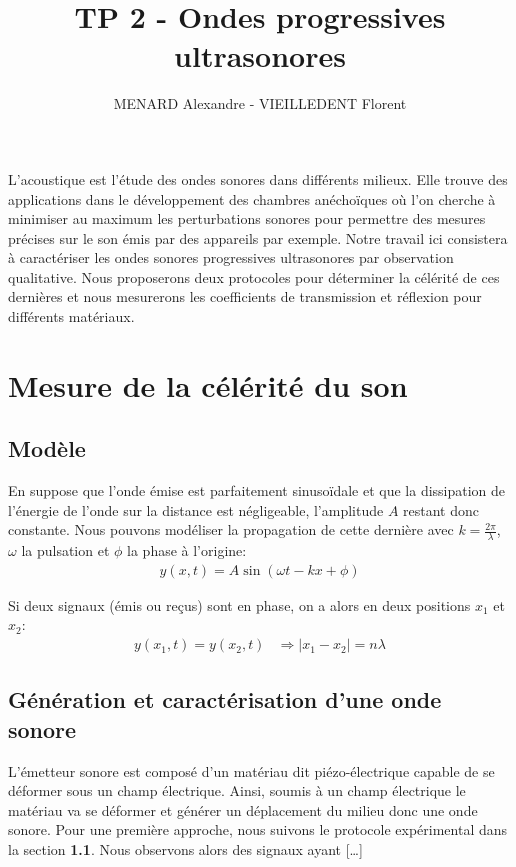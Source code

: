\documentclass[12pt]{article}
\title{\vspace{-2cm}\textbf{TP 2 - Ondes progressives ultrasonores}}
\author{MENARD Alexandre - VIEILLEDENT Florent}
\date{\vspace{-0.5cm}}
\begin{document}
\maketitle

L'acoustique est l'étude des ondes sonores dans différents milieux. Elle trouve des applications dans le développement des chambres
anéchoïques où l'on cherche à minimiser au maximum les perturbations sonores pour permettre des mesures précises sur le son émis par des appareils par exemple. 
Notre travail ici consistera à caractériser les ondes sonores progressives ultrasonores par observation qualitative. Nous proposerons
deux protocoles pour déterminer la célérité de ces dernières et nous mesurerons les coefficients de transmission et réflexion pour différents matériaux.

\section{Mesure de la célérité du son}
\subsection{Modèle}
En suppose que l'onde émise est parfaitement sinusoïdale et que la dissipation de l'énergie de l'onde sur la distance est négligeable, l'amplitude $A$ restant donc constante. 
Nous pouvons modéliser la propagation de cette dernière avec $k=\frac{2\pi}{\lambda}$, $\omega$ la pulsation et $\phi$ la phase à l'origine:
\begin{align}
	y(x, t) = A \sin(\omega t - kx + \phi)
\end{align}

Si deux signaux (émis ou reçus) sont en phase, on a alors en deux positions $x_1$ et $x_2$:
\begin{align*}
	y(x_1, t) = y(x_2, t) & \Rightarrow |x_1 - x_2| = n\lambda
\end{align*}

\subsection{Génération et caractérisation d'une onde sonore}
L'émetteur sonore est composé d'un matériau dit piézo-électrique capable de se déformer sous un champ électrique. Ainsi, soumis à un champ électrique
le matériau va se déformer et générer un déplacement du milieu donc une onde sonore. Pour une première approche, nous suivons le protocole
expérimental dans la section \textbf{1.1}. Nous observons alors des signaux ayant [\dots]
\end{document}
